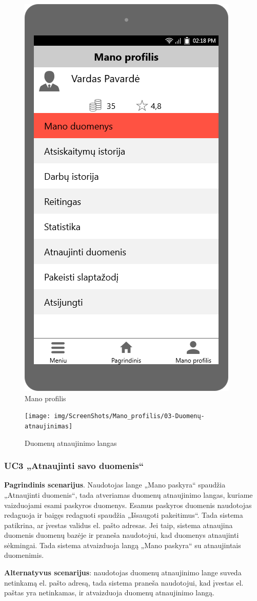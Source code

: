 \documentclass{VUMIFPSbakalaurinis}
\begin{document}
\begin{figure}[H]
	\centering
	\includegraphics[scale=0.4]{img/ScreenShots/Mano_profilis/00-Mano-profilis}
	\caption{Mano profilis}
	\label{img:profile}
\end{figure}

\begin{figure}[H]
	\centering
	\texttt{[image: img/ScreenShots/Mano\_profilis/03-Duomenų-atnaujinimas]}
	\caption{Duomenų atnaujinimo langas}
	\label{img:update profile}
\end{figure}
\subsubsection{UC3 „Atnaujinti savo duomenis“}
\textbf{Pagrindinis scenarijus}. Naudotojas lange „Mano paskyra“ spaudžia „Atnaujinti duomenis“, tada atveriamas duomenų atnaujinimo langas, kuriame vaizduojami esami paskyros duomenys. Esamus paskyros duomenis naudotojas redaguoja ir baigęs redaguoti spaudžia „Išsaugoti pakeitimus“. Tada sistema patikrina, ar įvestas validus el. pašto adresas. Jei taip, sistema atnaujina duomenis duomenų bazėje ir praneša naudotojui, kad duomenys atnaujinti sėkmingai. Tada sistema atvaizduoja langą „Mano paskyra“ su atnaujintais duomenimis. 
\par\textbf{Alternatyvus scenarijus}: naudotojas duomenų atnaujinimo lange suveda netinkamą el. pašto adresą, tada sistema praneša naudotojui, kad įvestas el. paštas yra netinkamas, ir atvaizduoja duomenų atnaujinimo langą.
\end{document}
